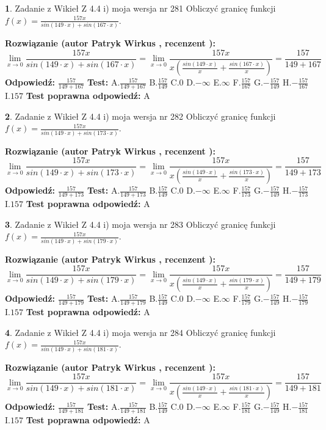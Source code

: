 \documentclass[12pt, a4paper]{article}
\theoremstyle{definition} %
\newtheorem{zad}{}
\newcommand{\zadStart}[1]{\begin{zad}#1\newline}
\newcommand{\zadStop}{\end{zad}}
\newcommand{\rozwStart}[2]{\noindent \textbf{Rozwiązanie (autor #1 , recenzent #2): }\newline}
\newcommand{\rozwStop}{\newline}
\newcommand{\odpStart}{\noindent \textbf{Odpowiedź:}\newline}
\newcommand{\odpStop}{\newline}
\newcommand{\testStart}{\noindent \textbf{Test:}\newline}
\newcommand{\testStop}{\newline}
\newcommand{\kluczStart}{\noindent \textbf{Test poprawna odpowiedź:}\newline}
\newcommand{\kluczStop}{\newline}
\begin{document}
\zadStart{Zadanie z Wikieł Z 4.4 i) moja wersja nr 281}
Obliczyć granicę funkcji $f(x)=\frac{157x}{sin(149\cdot x) +sin(167\cdot x)}$.
\zadStop
\rozwStart{Patryk Wirkus}{}
$$\lim\limits_{x\to 0}\frac{157x}{sin(149\cdot x) +sin(167\cdot x)}=\lim\limits_{x\to 0}\frac{157x}{x(\frac{sin(149\cdot x)}{x}+\frac{sin(167\cdot x)}{x})}=\frac{157}{149+167}$$
\rozwStop
\odpStart
$\frac{157}{149+167}$
\odpStop
\testStart
A.$\frac{157}{149+167}$
B.$\frac{157}{149}$
C.$0$
D.$-\infty$
E.$\infty$
F.$\frac{157}{167}$
G.$-\frac{157}{149}$
H.$-\frac{157}{167}$
I.$157$
\testStop
\kluczStart
A
\kluczStop



\zadStart{Zadanie z Wikieł Z 4.4 i) moja wersja nr 282}
Obliczyć granicę funkcji $f(x)=\frac{157x}{sin(149\cdot x) +sin(173\cdot x)}$.
\zadStop
\rozwStart{Patryk Wirkus}{}
$$\lim\limits_{x\to 0}\frac{157x}{sin(149\cdot x) +sin(173\cdot x)}=\lim\limits_{x\to 0}\frac{157x}{x(\frac{sin(149\cdot x)}{x}+\frac{sin(173\cdot x)}{x})}=\frac{157}{149+173}$$
\rozwStop
\odpStart
$\frac{157}{149+173}$
\odpStop
\testStart
A.$\frac{157}{149+173}$
B.$\frac{157}{149}$
C.$0$
D.$-\infty$
E.$\infty$
F.$\frac{157}{173}$
G.$-\frac{157}{149}$
H.$-\frac{157}{173}$
I.$157$
\testStop
\kluczStart
A
\kluczStop



\zadStart{Zadanie z Wikieł Z 4.4 i) moja wersja nr 283}
Obliczyć granicę funkcji $f(x)=\frac{157x}{sin(149\cdot x) +sin(179\cdot x)}$.
\zadStop
\rozwStart{Patryk Wirkus}{}
$$\lim\limits_{x\to 0}\frac{157x}{sin(149\cdot x) +sin(179\cdot x)}=\lim\limits_{x\to 0}\frac{157x}{x(\frac{sin(149\cdot x)}{x}+\frac{sin(179\cdot x)}{x})}=\frac{157}{149+179}$$
\rozwStop
\odpStart
$\frac{157}{149+179}$
\odpStop
\testStart
A.$\frac{157}{149+179}$
B.$\frac{157}{149}$
C.$0$
D.$-\infty$
E.$\infty$
F.$\frac{157}{179}$
G.$-\frac{157}{149}$
H.$-\frac{157}{179}$
I.$157$
\testStop
\kluczStart
A
\kluczStop



\zadStart{Zadanie z Wikieł Z 4.4 i) moja wersja nr 284}
Obliczyć granicę funkcji $f(x)=\frac{157x}{sin(149\cdot x) +sin(181\cdot x)}$.
\zadStop
\rozwStart{Patryk Wirkus}{}
$$\lim\limits_{x\to 0}\frac{157x}{sin(149\cdot x) +sin(181\cdot x)}=\lim\limits_{x\to 0}\frac{157x}{x(\frac{sin(149\cdot x)}{x}+\frac{sin(181\cdot x)}{x})}=\frac{157}{149+181}$$
\rozwStop
\odpStart
$\frac{157}{149+181}$
\odpStop
\testStart
A.$\frac{157}{149+181}$
B.$\frac{157}{149}$
C.$0$
D.$-\infty$
E.$\infty$
F.$\frac{157}{181}$
G.$-\frac{157}{149}$
H.$-\frac{157}{181}$
I.$157$
\testStop
\kluczStart
A
\kluczStop
\end{document}
